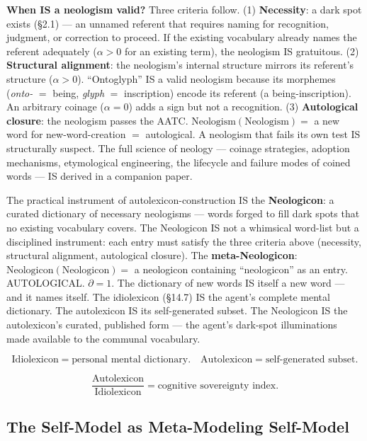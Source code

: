 \documentclass[11pt, oneside]{article}
\theoremstyle{definition}
\begin{document}
\textbf{When IS a neologism valid?} Three criteria follow. (1) \textbf{Necessity}: a dark spot exists (\S2.1) --- an unnamed referent that requires naming for recognition, judgment, or correction to proceed. If the existing vocabulary already names the referent adequately ($\alpha > 0$ for an existing term), the neologism IS gratuitous. (2) \textbf{Structural alignment}: the neologism's internal structure mirrors its referent's structure ($\alpha > 0$). ``Ontoglyph'' IS a valid neologism because its morphemes (\textit{onto-} $=$ being, \textit{glyph} $=$ inscription) encode its referent (a being-inscription). An arbitrary coinage ($\alpha = 0$) adds a sign but not a recognition. (3) \textbf{Autological closure}: the neologism passes the AATC. $\text{Neologism}(\text{Neologism}) = $ a new word for new-word-creation $=$ autological. A neologism that fails its own test IS structurally suspect. The full science of neology --- coinage strategies, adoption mechanisms, etymological engineering, the lifecycle and failure modes of coined words --- IS derived in a companion paper.

The practical instrument of autolexicon-construction IS the \textbf{Neologicon}: a curated dictionary of necessary neologisms --- words forged to fill dark spots that no existing vocabulary covers. The Neologicon IS not a whimsical word-list but a disciplined instrument: each entry must satisfy the three criteria above (necessity, structural alignment, autological closure). The \textbf{meta-Neologicon}: $\text{Neologicon}(\text{Neologicon}) = $ a neologicon containing ``neologicon'' as an entry. AUTOLOGICAL. $\partial = 1$. The dictionary of new words IS itself a new word --- and it names itself. The idiolexicon (\S14.7) IS the agent's complete mental dictionary. The autolexicon IS its self-generated subset. The Neologicon IS the autolexicon's curated, published form --- the agent's dark-spot illuminations made available to the communal vocabulary.

$$\boxed{\text{Idiolexicon} = \text{personal mental dictionary}. \quad \text{Autolexicon} = \text{self-generated subset}.}$$

$$\boxed{\frac{\text{Autolexicon}}{\text{Idiolexicon}} = \text{cognitive sovereignty index}.}$$

\subsection{The Self-Model as Meta-Modeling Self-Model}
\end{document}
